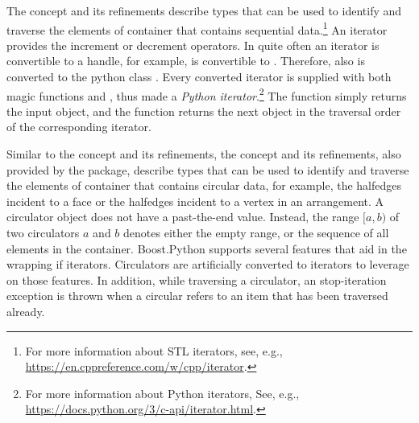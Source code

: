 The  concept and its refinements describe types
that can be used to identify and traverse the elements of container
that contains sequential data.\footnote{For more information about STL
  iterators, see, e.g.,
  \url{https://en.cppreference.com/w/cpp/iterator}.} An iterator
provides the increment or decrement operators. In \cgal{} quite often
an iterator is convertible to a handle, for example,
 is convertible to
. Therefore, also
 is converted to the
python class . Every converted iterator is
supplied with both magic functions  and
, thus made a \emph{Python
  iterator}.\footnote{For more information about Python iterators,
  See, e.g., \url{https://docs.python.org/3/c-api/iterator.html}.}
The  function simply returns the input object,
and the  function returns the next object in the
traversal order of the corresponding iterator.

Similar to the  concept and its refinements,
the  concept and its refinements, also
provided by the \HandlesandCirculatorsPackage{} package, describe
types that can be used to identify and traverse the elements of
container that contains circular data, for example, the halfedges
incident to a face or the halfedges incident to a vertex in an
arrangement.  A circulator object does not have a past-the-end
value. Instead, the range $[a, b)$ of two circulators $a$ and $b$
  denotes either the empty range, or the sequence of all elements in
  the container. Boost.Python supports several features that aid in
  the wrapping if iterators. Circulators are artificially converted to
  iterators to leverage on those features. In addition, while
  traversing a circulator, an stop-iteration exception is thrown when
  a circular refers to an item that has been traversed already.

